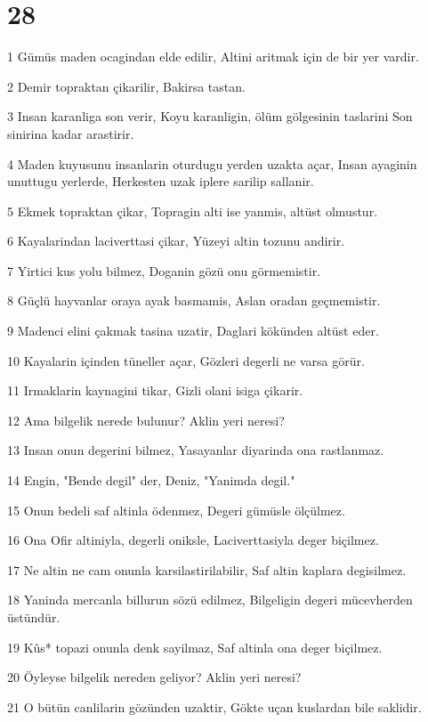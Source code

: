 \chapter{28}

\par 1 Gümüs maden ocagindan elde edilir, Altini aritmak için de bir yer vardir.
\par 2 Demir topraktan çikarilir, Bakirsa tastan.
\par 3 Insan karanliga son verir, Koyu karanligin, ölüm gölgesinin taslarini Son sinirina kadar arastirir.
\par 4 Maden kuyusunu insanlarin oturdugu yerden uzakta açar, Insan ayaginin unuttugu yerlerde, Herkesten uzak iplere sarilip sallanir.
\par 5 Ekmek topraktan çikar, Topragin alti ise yanmis, altüst olmustur.
\par 6 Kayalarindan laciverttasi çikar, Yüzeyi altin tozunu andirir.
\par 7 Yirtici kus yolu bilmez, Doganin gözü onu görmemistir.
\par 8 Güçlü hayvanlar oraya ayak basmamis, Aslan oradan geçmemistir.
\par 9 Madenci elini çakmak tasina uzatir, Daglari kökünden altüst eder.
\par 10 Kayalarin içinden tüneller açar, Gözleri degerli ne varsa görür.
\par 11 Irmaklarin kaynagini tikar, Gizli olani isiga çikarir.
\par 12 Ama bilgelik nerede bulunur? Aklin yeri neresi?
\par 13 Insan onun degerini bilmez, Yasayanlar diyarinda ona rastlanmaz.
\par 14 Engin, "Bende degil" der, Deniz, "Yanimda degil."
\par 15 Onun bedeli saf altinla ödenmez, Degeri gümüsle ölçülmez.
\par 16 Ona Ofir altiniyla, degerli oniksle, Laciverttasiyla deger biçilmez.
\par 17 Ne altin ne cam onunla karsilastirilabilir, Saf altin kaplara degisilmez.
\par 18 Yaninda mercanla billurun sözü edilmez, Bilgeligin degeri mücevherden üstündür.
\par 19 Kûs* topazi onunla denk sayilmaz, Saf altinla ona deger biçilmez.
\par 20 Öyleyse bilgelik nereden geliyor? Aklin yeri neresi?
\par 21 O bütün canlilarin gözünden uzaktir, Gökte uçan kuslardan bile saklidir.
